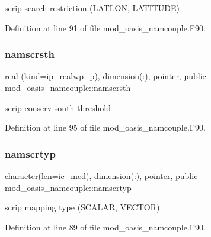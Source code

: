 scrip search restriction (L\+A\+T\+L\+ON, L\+A\+T\+I\+T\+U\+DE) 



Definition at line 91 of file mod\+\_\+oasis\+\_\+namcouple.\+F90.

\mbox{\label{namespacemod__oasis__namcouple_a50eb998713e5557b9fbb81cab781b6a8}} 
\subsubsection{\texorpdfstring{namscrsth}{namscrsth}}
{\footnotesize\ttfamily real (kind=ip\+\_\+realwp\+\_\+p), dimension(\+:), pointer, public mod\+\_\+oasis\+\_\+namcouple\+::namscrsth}



scrip conserv south threshold 



Definition at line 95 of file mod\+\_\+oasis\+\_\+namcouple.\+F90.

\mbox{\label{namespacemod__oasis__namcouple_a8ddbaabd22bbf485888b1df5f3578909}} 
\subsubsection{\texorpdfstring{namscrtyp}{namscrtyp}}
{\footnotesize\ttfamily character(len=ic\+\_\+med), dimension(\+:), pointer, public mod\+\_\+oasis\+\_\+namcouple\+::namscrtyp}



scrip mapping type (S\+C\+A\+L\+AR, V\+E\+C\+T\+OR) 



Definition at line 89 of file mod\+\_\+oasis\+\_\+namcouple.\+F90.

\mbox{\label{namespacemod__oasis__namcouple_a45b410743ce74a9824d44b329ba323ba}} 
